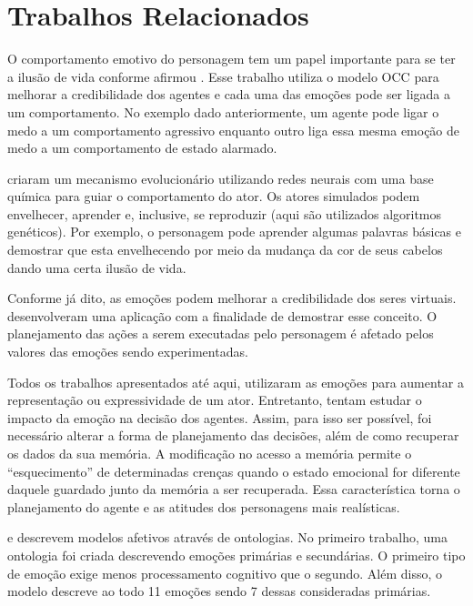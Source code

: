\section{Trabalhos Relacionados}


O comportamento emotivo do personagem tem um papel importante para se ter a
ilusão de vida conforme afirmou \citet{bates1994role}. Esse trabalho utiliza o
modelo OCC para melhorar a credibilidade dos agentes e cada uma das emoções
pode ser ligada a um comportamento. No exemplo dado anteriormente, um agente
pode ligar o medo a um comportamento agressivo enquanto outro liga essa mesma
emoção de medo a um comportamento de estado alarmado.

\citet{GraCli98} criaram um mecanismo evolucionário utilizando redes neurais
com uma base química para guiar o comportamento do ator. Os atores simulados
podem envelhecer, aprender e, inclusive, se reproduzir (aqui são utilizados
algoritmos genéticos).  Por exemplo, o personagem pode aprender algumas
palavras básicas e demostrar que esta envelhecendo por meio da mudança da cor
de seus cabelos dando uma certa ilusão de vida.

Conforme já dito, as emoções podem melhorar a credibilidade dos seres
virtuais.  \citet{zhang2009emotional} desenvolveram uma aplicação com a
finalidade de demostrar esse conceito. O planejamento das ações a serem
executadas pelo personagem é afetado pelos valores das emoções sendo
experimentadas.

Todos os trabalhos apresentados até aqui, utilizaram as emoções para aumentar
a representação ou expressividade de um ator. Entretanto,
\citet{neto2010construction} tentam estudar o impacto da emoção na decisão dos
agentes.  Assim, para isso ser possível, foi necessário alterar a forma de
planejamento das decisões, além de como recuperar os dados da sua memória.  A
modificação no acesso a memória permite o ``esquecimento'' de determinadas
crenças quando o estado emocional for diferente daquele guardado junto da
memória a ser recuperada. Essa característica torna o planejamento do agente e
as atitudes dos personagens mais realísticas.

\citet{benta2007ontology} e \citet{wks2008towards} descrevem modelos afetivos
através de ontologias. No primeiro trabalho, uma ontologia foi criada
descrevendo emoções primárias e secundárias. O primeiro tipo de emoção exige
menos processamento cognitivo que o segundo. Além disso, o modelo descreve ao
todo 11 emoções sendo 7 dessas consideradas primárias.

